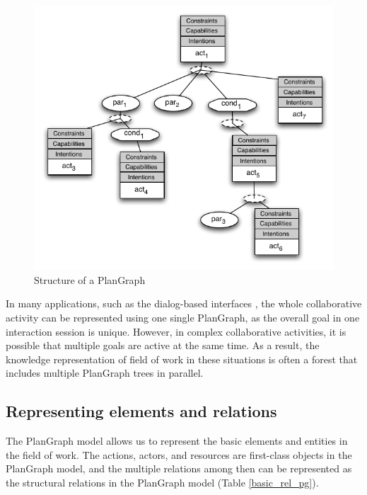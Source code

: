 \begin{figure}[htbp] %
   \centering
   \includegraphics{plangraph.pdf} 
   \caption{Structure of a PlanGraph}
   \label{fig:plangraph}
\end{figure}


In many applications, such as the dialog-based interfaces \cite{Cai2003,Cai2005}, the whole collaborative activity can be represented using one single PlanGraph, as the overall goal in one interaction session is unique. However, in complex collaborative activities, it is possible that multiple goals are active at the same time. As a result, the knowledge representation of field of work in these situations is often a forest that includes multiple PlanGraph trees in parallel.

\subsection{Representing elements and relations} %
\label{sub:representing_activities}
The PlanGraph model allows us to represent the basic elements and entities in the field of work. The actions, actors, and resources are first-class objects in the PlanGraph model, and the multiple relations among then can be represented as the structural relations in the PlanGraph model (Table \ref{basic_rel_pg}). 

